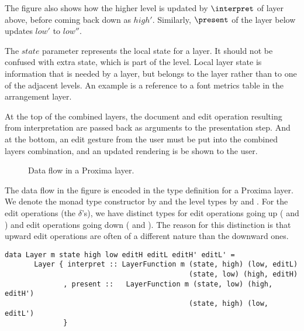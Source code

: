The figure also shows how the higher level is updated by $\interpret$ of layer above, before coming back down as $high'$. Similarly, $\present$ of the layer below updates $low'$ to $low''$. 

The $state$ parameter represents the local state for a layer. It should not be confused with extra state, which is part of the level. Local layer state is information that is needed by a layer, but belongs to the layer rather than to one of the adjacent levels. An example is a reference to a font metrics table in the arrangement layer.

At the top of the combined layers, the document and edit operation resulting from interpretation are passed back as arguments to the presentation step. And at the bottom, an edit gesture from the user must be put into the combined layers combination, and an updated rendering is be shown to the user. 
 
\begin{figure}
\begin{small}
\begin{center}
\begin{center}
\end{center}\caption{Data flow in a Proxima layer.} \label{proximaDataFlow}
\end{center}
\end{small}
\end{figure}


The data flow in the figure is encoded in the type definition for a Proxima layer. We denote the monad type constructor by  and the level types by  and . For the edit operations (the $\delta$'s), we have distinct types for edit operations going up  ( and ) and edit operations going down ( and ). The reason for this distinction is that upward edit operations are often of a different nature than the downward ones.

\begin{small}
\begin{verbatim}
data Layer m state high low editH editL editH' editL' =
       Layer { interpret :: LayerFunction m (state, high) (low, editL)
                                            (state, low) (high, editH)
              , present ::   LayerFunction m (state, low) (high, editH')
                                            (state, high) (low, editL')
              }
\end{verbatim}
\end{small}

